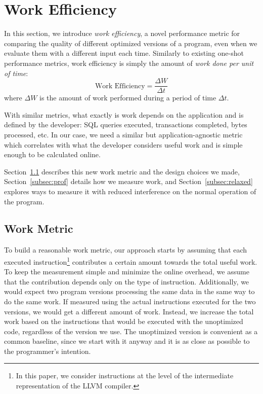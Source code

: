 \section{Work Efficiency} \label{sec:work}

    In this section, we introduce \textit{work efficiency}, a novel performance metric for comparing the quality of different optimized
    versions of a program, even when we evaluate them with a different input each time. Similarly to existing one-shot performance metrics,
    work efficiency is simply the amount of \textit{work done per unit of time}: 
    \[
        \textrm{Work Efficiency} = \frac{\Delta W}{\Delta t}
    \]
    where $\Delta W$ is the amount of work performed during a period of time $\Delta t$.

    With similar metrics, what exactly is work depends on the application and is defined by the developer: SQL queries executed,
    transactions completed, bytes processed, etc. In our case, we need a similar but application-agnostic metric which correlates with what
    the developer considers useful work and is simple enough to be calculated online.

    Section~\ref{subsec:workmetric} describes this new work metric and the design choices we made, Section~\ref{subsec:prof} details how
    we measure work, and Section~\ref{subsec:relaxed} explores ways to measure it with reduced interference on %
    the normal operation of the program.

    \subsection{Work Metric} \label{subsec:workmetric}

    To build a reasonable work metric, our approach starts by assuming that each executed instruction\footnote{In this paper, we consider instructions at the level of the intermediate representation of the LLVM compiler.} contributes a certain amount towards
    the total useful work. To keep the measurement simple and minimize the online overhead, we assume that the contribution depends only on
    the type of instruction. Additionally, we would expect two program versions processing the same data in the same way to do the same
    work. If measured using the actual instructions executed for the two versions, we would get a different amount of work. Instead, we
    increase the total work based on the instructions that would be executed with the unoptimized code, regardless of the version we use.
    The unoptimized version is convenient as a common baseline, since we start with it anyway and it is as close as possible to the
    programmer's intention.

